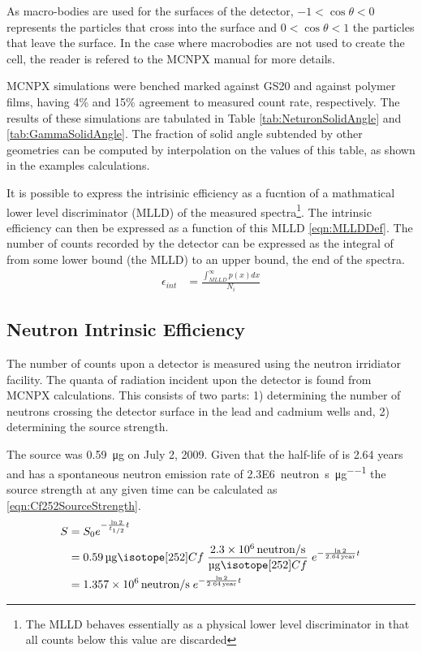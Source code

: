 \documentclass[draftcls,onecolumn]{IEEEtran}
\begin{document}
As macro-bodies are used for the surfaces of the detector, $-1<\cos\theta<0$ represents the particles that cross into the surface and $0<\cos\theta<1$ the particles that leave the surface.
In the case where macrobodies are not used to create the cell, the reader is refered to the MCNPX manual for more details.

MCNPX simulations were benched marked against GS20 and against polymer films, having 4\% and 15\% agreement to measured count rate, respectively.
The results of these simulations are tabulated in Table \ref{tab:NeturonSolidAngle} and \ref{tab:GammaSolidAngle}. 
The fraction of solid angle subtended by other geometries can be computed by interpolation on the values of this table, as shown in the examples calculations.

It is possible to express the intrisinic efficiency as a fucntion of a mathmatical lower level discriminator (MLLD) of the measured spectra\footnote{The MLLD behaves essentially as a physical lower level discriminator in that all counts below this value are discarded}.
The intrinsic efficiency can then be expressed as a function of this MLLD \eqref{eqn:MLLDDef}.
The number of counts recorded by the detector can be expressed as the integral of  from some lower bound (the MLLD) to an upper bound, the end of the spectra.
\begin{align}
	\label{eqn:MLLDDef}
	\epsilon_{int} &= \frac{\int_{MLLD}^\infty p(x)dx}{N_i}
\end{align}


\subsection{Neutron Intrinsic Efficiency}
The number of counts upon a detector is measured using the neutron irridiator facility.
The quanta of radiation incident upon the detector is found from MCNPX calculations.
This consists of two parts: 1) determining the number of neutrons crossing the detector surface in the lead and cadmium wells and, 2) determining the source strength.

The  source was \SI{0.59}{\ug} on July 2, 2009.
Given that the half-life of  is 2.64 years and  has a spontaneous neutron emission rate of \SI{2.3E6}{neutron\per\second\per\micro\gram} the source strength at any given time can be calculated as \eqref{eqn:Cf252SourceStrength}.
\begin{align}
  \label{eqn:Cf252SourceStrength}
  S &= S_0 e^{-\frac{\ln{2}}{t_{1/2}} t} \\ \notag 
    &= \SI{0.59}{\ug} \iso[252]{Cf} \;\frac{\SI{2.3E6}{neutron\per\second}}{\si{\ug} \iso[252]{Cf}}\; e^{-\frac{ \ln{2}}{\SI{2.64}{year}}t}  \\ \notag
    &= \SI{1.357E6}{neutron\per\second}\; e^{-\frac{ \ln{2}}{\SI{2.64}{year}}t} 
\end{align}
\end{document}
